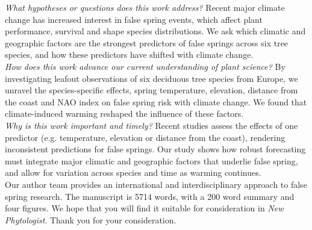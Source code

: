 \documentclass[11pt,a4paper]{article}\usepackage[]{graphicx}\usepackage[]{color}
\begin{document}
\noindent \textit{What hypotheses or questions does this work address?} Recent major climate change has increased interest in false spring events, which affect plant performance, survival and shape species distributions. We ask which climatic and geographic factors are the strongest predictors of false springs across six tree species, and how these predictors have shifted with climate change. \\

\noindent \textit{How does this work advance our current understanding of plant science?} By investigating leafout observations of six deciduous tree species from Europe, we unravel the species-specific effects, spring temperature, elevation, distance from the coast and NAO index on false spring risk with climate change. We found that climate-induced warming reshaped the influence of these factors. \\

\noindent \textit{Why is this work important and timely?} Recent studies assess the effects of one predictor (e.g. temperature, elevation or distance from the coast), rendering inconsistent predictions for false springs. Our study shows how robust forecasting must integrate major climatic and geographic factors that underlie false spring, and allow for variation across species and time as warming continues. \\

\noindent Our author team provides an international and interdisciplinary approach to false spring research. The manuscript is 5714 words, with a 200 word summary and four figures. We hope that you will find it suitable for consideration in \textit{New Phytologist}. Thank you for your consideration. \\
\end{document}
